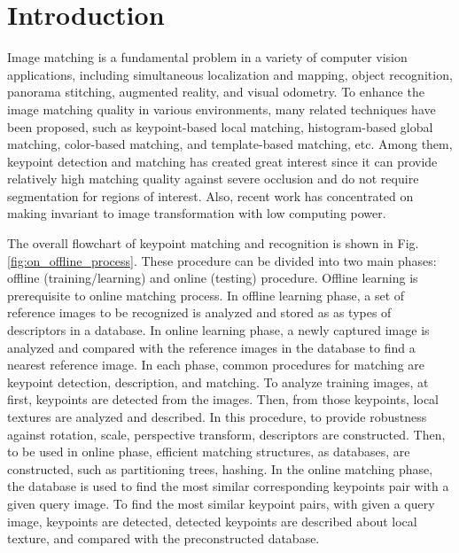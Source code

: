 
\section{Introduction}
\label{sec:intro}

Image matching is a fundamental problem in a variety of computer vision applications, including simultaneous localization and mapping\cite{chang_p-slam:_2007,davison_monoslam:_2007}, object recognition\cite{nister_scalable_2006}, panorama stitching\cite{brown_recognising_2003,wagner_real-time_2010}, augmented reality\cite{klein_parallel_2007,wagner_multiple_2009}, and visual odometry\cite{cheng_visual_2006,nister_visual_2004}. To enhance the image matching quality in various environments, many related techniques have been proposed, such as keypoint-based local matching, histogram-based global matching\cite{le_improving_2013,goncalves_hairis:_2011}, color-based matching\cite{mehtre_color_1995,kankanhalli_cluster-based_1996}, and template-based matching\cite{korman_fast-match:_2013}, etc. Among them, keypoint detection and matching has created great interest since it can provide relatively high matching quality against severe occlusion and do not require segmentation for regions of interest. Also, recent work has concentrated on making invariant to image transformation with low computing power\cite{carrera_robust_2007,mikolajczyk_performance_2005}.

The overall flowchart of keypoint matching and recognition is shown in Fig. \ref{fig:on_offline_process}. These procedure can be divided into two main phases: offline (training/learning) and online (testing) procedure. Offline learning is prerequisite to online matching process. In offline learning phase, a set of reference images to be recognized is analyzed and stored as as types of descriptors in a database. In online learning phase, a newly captured image is analyzed and compared with the reference images in the database to find a nearest reference image. In each phase, common procedures for matching are keypoint detection, description, and matching. To analyze training images, at first, keypoints are detected from the images. Then, from those keypoints, local textures are analyzed and described. In this procedure, to provide robustness against rotation, scale, perspective transform, descriptors are constructed. Then, to be used in online phase, efficient matching structures, as databases, are constructed, such as partitioning trees\cite{arya_optimal_1998,beis_shape_1997,muja_fast_2012}, hashing\cite{salakhutdinov_semantic_2009,gionis_similarity_1999,lv_multi-probe_2007}. In the online matching phase, the database is used to find the most similar corresponding keypoints pair with a given query image. To find the most similar keypoint pairs, with given a query image, keypoints are detected, detected keypoints are described about local texture, and compared with the preconstructed database.

